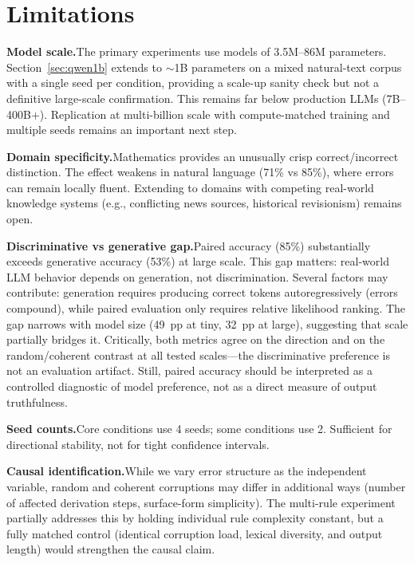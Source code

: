 \documentclass{article}
\begin{document}
\section*{Limitations}
\label{sec:limitations}

\textbf{Model scale.}\quad The primary experiments use models of 3.5M--86M parameters. Section~\ref{sec:qwen1b} extends to ${\sim}$1B parameters on a mixed natural-text corpus with a single seed per condition, providing a scale-up sanity check but not a definitive large-scale confirmation. This remains far below production LLMs (7B--400B+). Replication at multi-billion scale with compute-matched training and multiple seeds remains an important next step.

\textbf{Domain specificity.}\quad Mathematics provides an unusually crisp correct/incorrect distinction. The effect weakens in natural language (71\% vs 85\%), where errors can remain locally fluent. Extending to domains with competing real-world knowledge systems (e.g., conflicting news sources, historical revisionism) remains open.

\textbf{Discriminative vs generative gap.}\quad Paired accuracy (85\%) substantially exceeds generative accuracy (53\%) at large scale. This gap matters: real-world LLM behavior depends on generation, not discrimination. Several factors may contribute: generation requires producing correct tokens autoregressively (errors compound), while paired evaluation only requires relative likelihood ranking. The gap narrows with model size (49~pp at tiny, 32~pp at large), suggesting that scale partially bridges it. Critically, both metrics agree on the direction and on the random/coherent contrast at all tested scales---the discriminative preference is not an evaluation artifact. Still, paired accuracy should be interpreted as a controlled diagnostic of model preference, not as a direct measure of output truthfulness.

\textbf{Seed counts.}\quad Core conditions use 4 seeds; some conditions use 2. Sufficient for directional stability, not for tight confidence intervals.

\textbf{Causal identification.}\quad While we vary error structure as the independent variable, random and coherent corruptions may differ in additional ways (number of affected derivation steps, surface-form simplicity). The multi-rule experiment partially addresses this by holding individual rule complexity constant, but a fully matched control (identical corruption load, lexical diversity, and output length) would strengthen the causal claim.
\end{document}
